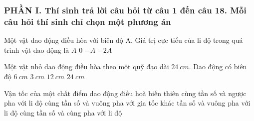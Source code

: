 \subsubsection*{PHẦN I. Thí sinh trả lời câu hỏi từ câu 1 đến câu 18. Mỗi câu hỏi thí sinh chỉ chọn một phương án}
\setcounter{ex}{0}
	\begin{ex}%
		Một vật dao động điều hòa với biên độ A. Giá trị cực tiểu của li độ trong quá trình vật dao động là
		\choice
		{$A$}
		{$0$}
		{\True $-A$}
		{$-2A$}
	\end{ex}
	\begin{ex}%
		Một vật nhỏ dao động điều hòa theo một quỹ đạo dài $24\ cm$. Dao động có biên độ
		\choice
		{$6\ cm$}
		{$3\ cm$}
		{\True $12\ cm$}
		{$24\ cm$}
	\end{ex}
	\begin{ex}%
		Vận tốc của một chất điểm dao động điều hoà biến thiên
		\choice
		{cùng tần số và ngược pha với li độ}
		{\True cùng tần số và vuông pha với gia tốc}
		{khác tần số và vuông pha với li độ}
		{cùng tần số và cùng pha với li độ}
	\end{ex}
